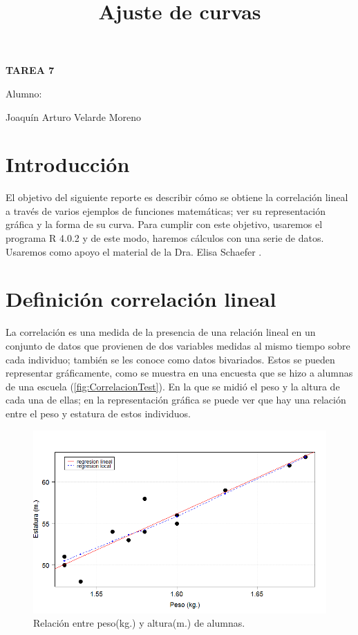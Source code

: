 \documentclass[]{article}
\title{Ajuste de curvas }
\date{}
\begin{document}
	\maketitle
	\begin{center}


\centerline{\textbf{TAREA 7} } 
\textbf{ }

\centerline{Alumno: } 
\centerline{Joaquín Arturo Velarde Moreno}


	\end{center}
	

\section{Introducción}
El objetivo del siguiente reporte es describir cómo se obtiene la correlación lineal a través de varios ejemplos de funciones matemáticas; ver su representación gráfica y la forma de su curva. Para cumplir con este objetivo, usaremos el programa R 4.0.2 \cite{rproject} y de este modo, haremos cálculos con una serie de datos.
Usaremos como apoyo el material de la Dra. Elisa Schaefer \cite{MaterialClase}.


\section{Definición correlación lineal}
La correlación es una medida de la presencia de una relación lineal en un conjunto de datos que provienen de dos variables medidas al mismo tiempo sobre cada individuo; también se les conoce como datos bivariados.
Estos se pueden representar gráficamente, como se muestra en una encuesta que se hizo a alumnas de una escuela (\autoref{fig:CorrelacionTest}). En la que se midió el peso y la altura de cada una de ellas; en la representación gráfica se puede ver que hay una relación entre el peso y estatura de estos individuos.

\begin{figure}[hbt!] 
\centering \includegraphics[width=.7\linewidth]{Figuras/CorrelacionTest.png}                 \caption{Relación entre peso(kg.) y altura(m.) de alumnas.}
\label{fig:CorrelacionTest}
\end{figure}
\end{document}

